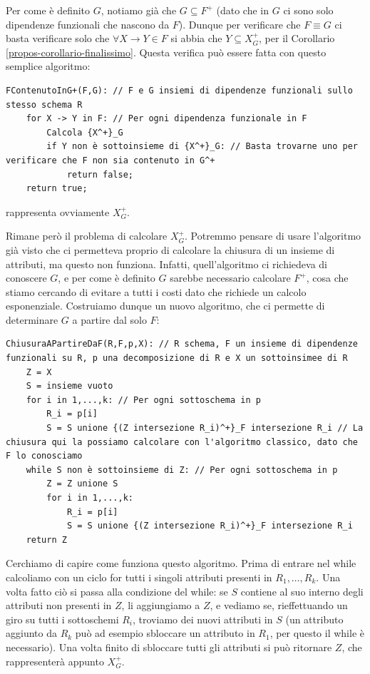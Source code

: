 \documentclass[11pt, a4paper, titlepage, oneside]{scrbook}
\begin{document}
Per come è definito $G$, notiamo già che $G \subseteq F^+$ (dato che in $G$ ci sono solo dipendenze funzionali che nascono da $F$). Dunque per verificare che $F \equiv G$ ci basta verificare solo che $\forall X \longrightarrow Y \in F$ si abbia che $Y \subseteq X_G^+$, per il Corollario \ref{propos-corollario-finalissimo}. Questa verifica può essere fatta con questo semplice algoritmo:
\begin{lstlisting}
FContenutoInG+(F,G): // F e G insiemi di dipendenze funzionali sullo stesso schema R
    for X -> Y in F: // Per ogni dipendenza funzionale in F
        Calcola {X^+}_G
        if Y non è sottoinsieme di {X^+}_G: // Basta trovarne uno per verificare che F non sia contenuto in G^+
            return false;
    return true;
\end{lstlisting}

\NB {} rappresenta ovviamente $X^+_G$.

Rimane però il problema di calcolare $X^+_G$. Potremmo pensare di usare l'algoritmo già visto che ci permetteva proprio di calcolare la chiusura di un insieme di attributi, ma questo non funziona. Infatti, quell'algoritmo ci richiedeva di conoscere $G$, e per come è definito $G$ sarebbe necessario calcolare $F^+$, cosa che stiamo cercando di evitare a tutti i costi dato che richiede un calcolo esponenziale. Costruiamo dunque un nuovo algoritmo, che ci permette di determinare $G$ a partire dal solo $F$:

\begin{lstlisting}
ChiusuraAPartireDaF(R,F,p,X): // R schema, F un insieme di dipendenze funzionali su R, p una decomposizione di R e X un sottoinsimee di R
    Z = X
    S = insieme vuoto
    for i in 1,...,k: // Per ogni sottoschema in p
        R_i = p[i]
        S = S unione {(Z intersezione R_i)^+}_F intersezione R_i // La chiusura qui la possiamo calcolare con l'algoritmo classico, dato che F lo conosciamo
    while S non è sottoinsieme di Z: // Per ogni sottoschema in p
        Z = Z unione S
        for i in 1,...,k:
            R_i = p[i]
            S = S unione {(Z intersezione R_i)^+}_F intersezione R_i
    return Z
\end{lstlisting}

Cerchiamo di capire come funziona questo algoritmo. Prima di entrare nel while calcoliamo con un ciclo for tutti i singoli attributi presenti in $R_1, \ldots, R_k$. Una volta fatto ciò si passa alla condizione del while: se $S$ contiene al suo interno degli attributi non presenti in $Z$, li aggiungiamo a $Z$, e vediamo se, rieffettuando un giro su tutti i sottoschemi $R_i$, troviamo dei nuovi attributi in $S$ (un attributo aggiunto da $R_k$ può ad esempio sbloccare un attributo in $R_1$, per questo il while è necessario). Una volta finito di sbloccare tutti gli attributi si può ritornare $Z$, che rappresenterà appunto $X^+_G$. 
\end{document}
